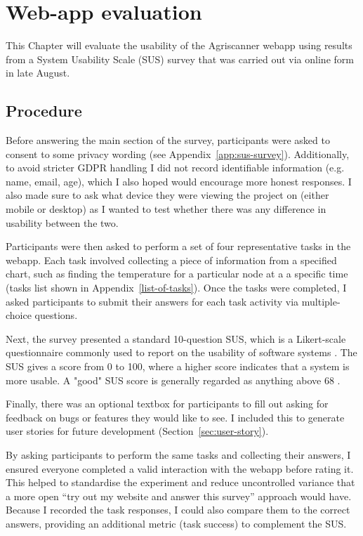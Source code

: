\section{Web-app evaluation}

This Chapter will evaluate the usability of the Agriscanner webapp using results
from a System Usability Scale (SUS) survey that was carried out via online form
in late August.

\subsection{Procedure}

Before answering the main section of the survey, participants were asked to
consent to some privacy wording (see Appendix~\ref{app:sus-survey}).
Additionally, to avoid stricter GDPR handling I did not record identifiable
information (e.g. name, email, age), which I also hoped would encourage more
honest responses. I also made sure to ask what device they were viewing the
project on (either mobile or desktop) as I wanted to test whether there was any
difference in usability between the two.

Participants were then asked to perform a set of four representative tasks in
the webapp. Each task involved collecting a piece of information from a
specified chart, such as finding the temperature for a particular node at a a
specific time (tasks list shown in Appendix~\ref{list-of-tasks}). Once the tasks
were completed, I asked participants to submit their answers for each task
activity via multiple-choice questions.

Next, the survey presented a standard 10-question SUS, which is a Likert-scale
questionnaire commonly used to report on the usability of software systems
\cite{brookeSUS1995}. The SUS gives a score from 0 to 100, where a higher score
indicates that a system is more usable. A "good" SUS score is generally regarded
as anything above 68 \cite{sauro2016quantifying}.

Finally, there was an optional textbox for participants to fill out asking for
feedback on bugs or features they would like to see. I included this to generate
user stories for future development (Section~\ref{sec:user-story}).

By asking participants to perform the same tasks and collecting their answers, I
ensured everyone completed a valid interaction with the webapp before rating it.
This helped to standardise the experiment and reduce uncontrolled variance that
a more open “try out my website and answer this survey” approach would have.
Because I recorded the task responses, I could also compare them to the correct
answers, providing an additional metric (task success) to complement the SUS.

